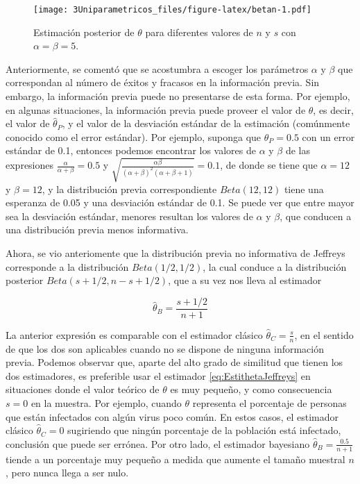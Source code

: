 \documentclass[
  10pt,
  spanish,
]{book}
\theoremstyle{definition}
\theoremstyle{definition}
\theoremstyle{definition}
\theoremstyle{definition}
\theoremstyle{remark}
\begin{document}
\begin{figure}
\centering
\texttt{[image: 3Uniparametricos\_files/figure-latex/betan-1.pdf]}
\caption{\label{fig:betan}Estimación posterior de \(\theta\) para diferentes valores de \(n\) y \(s\) con \(\alpha=\beta=5\).}
\end{figure}

Anteriormente, se comentó que se acostumbra a escoger los parámetros
\(\alpha\) y \(\beta\) que correspondan al número de éxitos y fracasos en la
información previa. Sin embargo, la información previa puede no
presentarse de esta forma. Por ejemplo, en algunas situaciones, la
información previa puede proveer el valor de \(\theta\), es decir, el
valor de \(\hat{\theta}_P\), y el valor de la desviación estándar de la
estimación (comúnmente conocido como el error estándar). Por ejemplo,
suponga que \(\hat{\theta}_P=0.5\) con un error estándar de 0.1, entonces
podemos encontrar los valores de \(\alpha\) y \(\beta\) de las expresiones
\(\frac{\alpha}{\alpha+\beta}=0.5\) y
\(\sqrt{\frac{\alpha\beta}{(\alpha+\beta)^2(\alpha+\beta+1)}}=0.1\), de
donde se tiene que \(\alpha=12\) y \(\beta=12\), y la distribución previa
correspondiente \(Beta(12, 12)\) tiene una esperanza de 0.05 y una
desviación estándar de 0.1. Se puede ver que entre mayor sea la
desviación estándar, menores resultan los valores de \(\alpha\) y \(\beta\),
que conducen a una distribución previa menos informativa.

Ahora, se vio anteriomente que la distribución previa no informativa de
Jeffreys corresponde a la distribución \(Beta(1/2, 1/2)\), la cual conduce
a la distribución posterior \(Beta(s+1/2, n-s+1/2)\), que a su vez nos
lleva al estimador

\begin{equation}
\label{eq:EstithetaJeffreys}
\hat{\theta}_B=\frac{s+1/2}{n+1}
\end{equation}

La anterior expresión es comparable con el estimador clásico
\(\hat{\theta}_C=\frac{s}{n}\), en el sentido de que los dos son
aplicables cuando no se dispone de ninguna información previa. Podemos
observar que, aparte del alto grado de similitud que tienen los dos
estimadores, es preferible usar el estimador \eqref{eq:EstithetaJeffreys} en situaciones donde el valor teórico de \(\theta\) es muy pequeño, y
como consecuencia \(s=0\) en la muestra. Por ejemplo, cuando \(\theta\)
representa el porcentaje de personas que están infectados con algún
virus poco común. En estos casos, el estimador clásico
\(\hat{\theta}_C=0\) sugiriendo que ningún porcentaje de la población está
infectado, conclusión que puede ser errónea. Por otro lado, el estimador
bayesiano \(\hat{\theta}_B=\frac{0.5}{n+1}\) tiende a un porcentaje muy pequeño a medida que aumente el tamaño muestral \(n\),
pero nunca llega a ser nulo.
\end{document}
